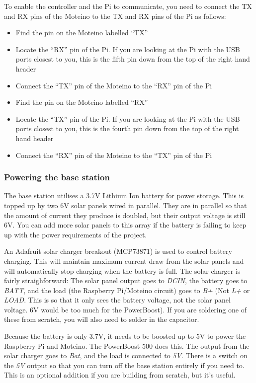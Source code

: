 \documentclass[10pt]{article}
\begin{document}
To enable the controller and the Pi to communicate, you need to connect the TX and RX pins of the Moteino to the TX and RX pins of the Pi as follows:

\begin{itemize}
 \item Find the pin on the Moteino labelled ``TX''
 \item Locate the ``RX'' pin of the Pi. If you are looking at the Pi with the USB ports closest to you, this is the fifth pin down from the top of the right hand header
 \item Connect the ``TX'' pin of the Moteino to the ``RX'' pin of the Pi
 \item Find the pin on the Moteino labelled ``RX''
 \item Locate the ``TX'' pin of the Pi. If you are looking at the Pi with the USB ports closest to you, this is the fourth pin down from the top of the right hand header
 \item Connect the ``RX'' pin of the Moteino to the ``TX'' pin of the Pi
\end{itemize}

\subsubsection{Powering the base station}
The base station utilises a 3.7V Lithium Ion battery for power storage. This is topped up by two 6V solar panels wired in parallel. They are in parallel so that the amount of current they produce is doubled, but their output voltage is still 6V. You can add more solar panels to this array if the battery is failing to keep up with the power requirements of the project.

An Adafruit solar charger breakout (MCP73871) is used to control battery charging. This will maintain maximum current draw from the solar panels and will automatically stop charging when the battery is full. The solar charger is fairly straighforward: The solar panel output goes to \textit{DCIN}, the battery goes to \textit{BATT}, and the load (the Raspberry Pi/Moteino circuit) goes to \textit{B+} (Not \textit{L+} or \textit{LOAD}. This is so that it only sees the battery voltage, not the solar panel voltage. 6V would be too much for the PowerBoost). If you are soldering one of these from scratch, you will also need to solder in the capacitor.

Because the battery is only 3.7V, it needs to be boosted up to 5V to power the Raspberry Pi and Moteino. The PowerBoost 500 does this. The output from the solar charger goes to \textit{Bat}, and the load is connected to \textit{5V}. There is a switch on the \textit{5V} output so that you can turn off the base station entirely if you need to. This is an optional addition if you are building from scratch, but it's useful.
\end{document}
